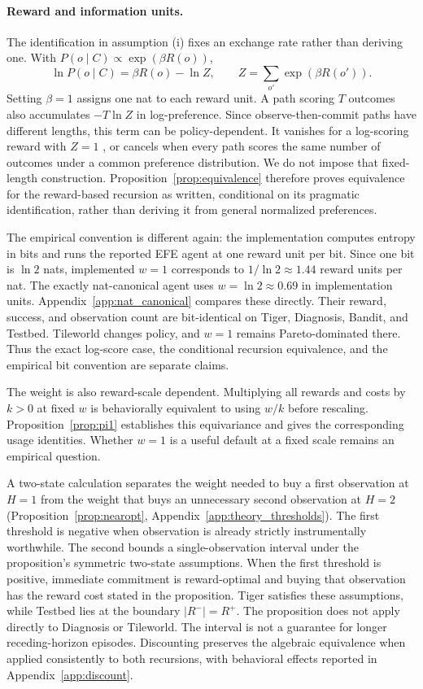 \documentclass[runningheads]{llncs}
\begin{document}
\paragraph{Reward and information units.}
The identification in assumption (i) fixes an exchange rate rather than deriving one. With $P(o\mid C)\propto\exp(\beta R(o))$,
\[
\ln P(o\mid C)=\beta R(o)-\ln Z,\qquad Z=\sum_{o'}\exp(\beta R(o')).
\]
Setting $\beta=1$ assigns one nat to each reward unit. A path scoring $T$ outcomes also accumulates $-T\ln Z$ in log-preference. Since observe-then-commit paths have different lengths, this term can be policy-dependent. It vanishes for a log-scoring reward with $Z=1$ \citep{bernardo1979}, or cancels when every path scores the same number of outcomes under a common preference distribution. We do not impose that fixed-length construction. Proposition~\ref{prop:equivalence} therefore proves equivalence for the reward-based recursion as written, conditional on its pragmatic identification, rather than deriving it from general normalized preferences.

The empirical convention is different again: the implementation computes entropy in bits and runs the reported EFE agent at one reward unit per bit. Since one bit is $\ln 2$ nats, implemented $w=1$ corresponds to $1/\ln 2\approx1.44$ reward units per nat. The exactly nat-canonical agent uses $w=\ln 2\approx0.69$ in implementation units. Appendix~\ref{app:nat_canonical} compares these directly. Their reward, success, and observation count are bit-identical on Tiger, Diagnosis, Bandit, and Testbed. Tileworld changes policy, and $w=1$ remains Pareto-dominated there. Thus the exact log-score case, the conditional recursion equivalence, and the empirical bit convention are separate claims.

The weight is also reward-scale dependent. Multiplying all rewards and costs by $k>0$ at fixed $w$ is behaviorally equivalent to using $w/k$ before rescaling. Proposition~\ref{prop:pi1} establishes this equivariance and gives the corresponding usage identities. Whether $w=1$ is a useful default at a fixed scale remains an empirical question.

A two-state calculation separates the weight needed to buy a first observation at $H=1$ from the weight that buys an unnecessary second observation at $H=2$ (Proposition~\ref{prop:nearopt}, Appendix~\ref{app:theory_thresholds}). The first threshold is negative when observation is already strictly instrumentally worthwhile. The second bounds a single-observation interval under the proposition's symmetric two-state assumptions. When the first threshold is positive, immediate commitment is reward-optimal and buying that observation has the reward cost stated in the proposition. Tiger satisfies these assumptions, while Testbed lies at the boundary $|R^-|=R^+$. The proposition does not apply directly to Diagnosis or Tileworld. The interval is not a guarantee for longer receding-horizon episodes. Discounting preserves the algebraic equivalence when applied consistently to both recursions, with behavioral effects reported in Appendix~\ref{app:discount}.
\end{document}
